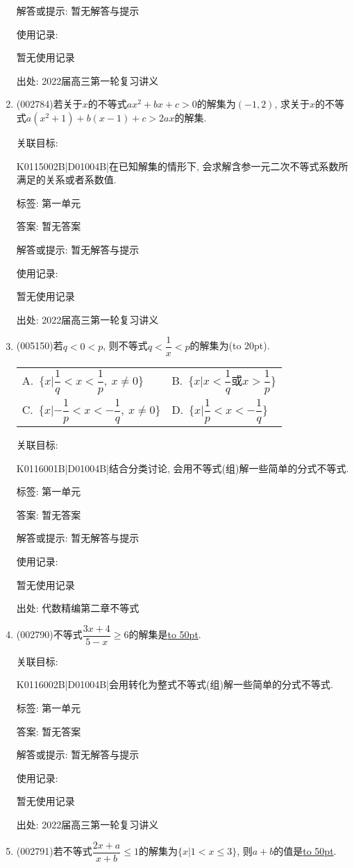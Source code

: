 \documentclass[10pt,a4paper]{article}
\newcommand{\blank}[1]{\underline{\hbox to #1pt{}}}
\newcommand{\bracket}[1]{(\hbox to #1pt{})}
\newcommand{\twoch}[4]{\par\begin{tabular}{p{.46\textwidth}p{.46\textwidth}}
A.~#1& B.~#2\\
C.~#3& D.~#4
\end{tabular}}
\begin{document}
\begin{enumerate}[1.]
解答或提示: 暂无解答与提示

使用记录:

暂无使用记录


出处: 2022届高三第一轮复习讲义
\item { (002784)}若关于$x$的不等式$ax^2+bx+c>0$的解集为$(-1,2)$, 求关于$x$的不等式$a(x^2+1)+b(x-1)+c>2ax$的解集.


关联目标:

K0115002B|D01004B|在已知解集的情形下, 会求解含参一元二次不等式系数所满足的关系或者系数值.



标签: 第一单元

答案: 暂无答案

解答或提示: 暂无解答与提示

使用记录:

暂无使用记录


出处: 2022届高三第一轮复习讲义
\item { (005150)}若$q<0<p$, 则不等式$q<\dfrac 1x<p$的解集为\bracket{20}.
\twoch{$\{x|\dfrac 1q<x<\dfrac 1p,\  x\ne 0\}$}{$\{x|x<\dfrac 1q\text{或}x>\dfrac 1p\}$}{$\{x|-\dfrac 1p<x<-\dfrac 1q, \ x\ne 0\}$}{$\{x|\dfrac 1p<x<-\dfrac 1q\}$}


关联目标:

K0116001B|D01004B|结合分类讨论, 会用不等式(组)解一些简单的分式不等式.



标签: 第一单元

答案: 暂无答案

解答或提示: 暂无解答与提示

使用记录:

暂无使用记录


出处: 代数精编第二章不等式
\item { (002790)}不等式$\dfrac{3x+4}{5-x}\ge 6$的解集是\blank{50}.


关联目标:

K0116002B|D01004B|会用转化为整式不等式(组)解一些简单的分式不等式.



标签: 第一单元

答案: 暂无答案

解答或提示: 暂无解答与提示

使用记录:

暂无使用记录


出处: 2022届高三第一轮复习讲义
\item { (002791)}若不等式$\dfrac{2x+a}{x+b}\le 1$的解集为$\{x|1<x\le 3\}$, 则$a+b$的值是\blank{50}.



\end{enumerate}
\end{document}
